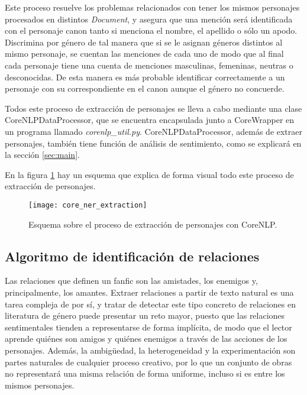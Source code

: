 \documentclass{pre-tfg}
\begin{document}
Este proceso resuelve los problemas relacionados con tener los mismos personajes procesados en distintos \textit{Document}, y asegura que una mención será identificada con el personaje canon tanto si menciona el nombre, el apellido o sólo un apodo. Discrimina por género de tal manera que si se le asignan géneros distintos al mismo personaje, se cuentan las menciones de cada uno de modo que al final cada personaje tiene una cuenta de menciones masculinas, femeninas, neutras o desconocidas. De esta manera es más probable identificar correctamente a un personaje con su correspondiente en el canon aunque el género no concuerde.

Todos este proceso de extracción de personajes se lleva a cabo mediante una clase CoreNLPDataProcessor, que se encuentra encapsulada junto a CoreWrapper en un programa llamado \textit{corenlp\_util.py}. CoreNLPDataProcessor, además de extraer personajes, también tiene función de análisis de sentimiento, como se explicará en la sección \ref{sec:main}.

En la figura \ref{fig:ner_extraction_corenlp} hay un esquema que explica de forma visual todo este proceso de extracción de personajes.

\begin{figure}[!h]
	\centering
	\texttt{[image: core\_ner\_extraction]}
	\caption{Esquema sobre el proceso de extracción de personajes con CoreNLP.}
	\label{fig:ner_extraction_corenlp}
\end{figure}



\subsection{Algoritmo de identificación de relaciones}

Las relaciones que definen un fanfic son las amistades, los enemigos y, principalmente, los amantes. Extraer relaciones a partir de texto natural es una tarea compleja de por sí, y tratar de detectar este tipo concreto de relaciones en literatura de género puede presentar un reto mayor, puesto que las relaciones sentimentales tienden a representarse de forma implícita, de modo que el lector aprende quiénes son amigos y quiénes enemigos a través de las acciones de los personajes. Además, la ambigüedad, la heterogeneidad y la experimentación son partes naturales de cualquier proceso creativo, por lo que un conjunto de obras no representará una misma relación de forma uniforme, incluso si es entre los mismos personajes.
\end{document}
